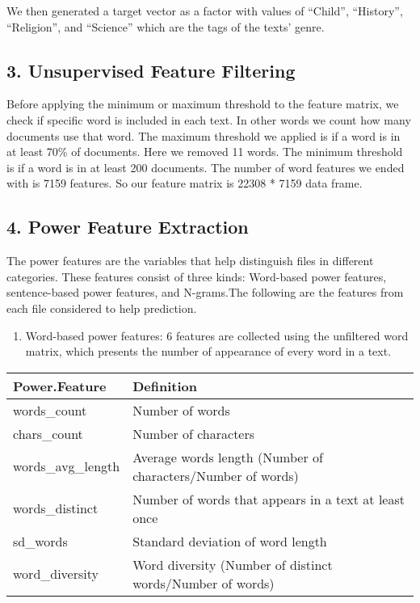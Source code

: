\documentclass[12pt,]{article}
\begin{document}
We then generated a target vector as a factor with values of ``Child'',
``History'', ``Religion'', and ``Science'' which are the tags of the
texts' genre.

\subsection{{3. Unsupervised Feature
Filtering}}\label{unsupervised-feature-filtering}

Before applying the minimum or maximum threshold to the feature matrix,
we check if specific word is included in each text. In other words we
count how many documents use that word. The maximum threshold we applied
is if a word is in at least 70\% of documents. Here we removed 11 words.
The minimum threshold is if a word is in at least 200 documents. The
number of word features we ended with is 7159 features. So our feature
matrix is 22308 * 7159 data frame.

\subsection{{4. Power Feature
Extraction}}\label{power-feature-extraction}

The power features are the variables that help distinguish files in
different categories. These features consist of three kinds: Word-based
power features, sentence-based power features, and N-grams.The following
are the features from each file considered to help prediction.

\begin{enumerate}
\def\labelenumi{(\arabic{enumi})}
\itemsep1pt\parskip0pt
\item
  Word-based power features: 6 features are collected using the
  unfiltered word matrix, which presents the number of appearance of
  every word in a text.
\end{enumerate}

\begin{longtable}[c]{@{}ll@{}}
\toprule
Power.Feature & Definition\tabularnewline
\midrule
\endhead
words\_count & Number of words\tabularnewline
chars\_count & Number of characters\tabularnewline
words\_avg\_length & Average words length (Number of characters/Number
of words)\tabularnewline
words\_distinct & Number of words that appears in a text at least
once\tabularnewline
sd\_words & Standard deviation of word length\tabularnewline
word\_diversity & Word diversity (Number of distinct words/Number of
words)\tabularnewline
\bottomrule
\end{longtable}
\end{document}
